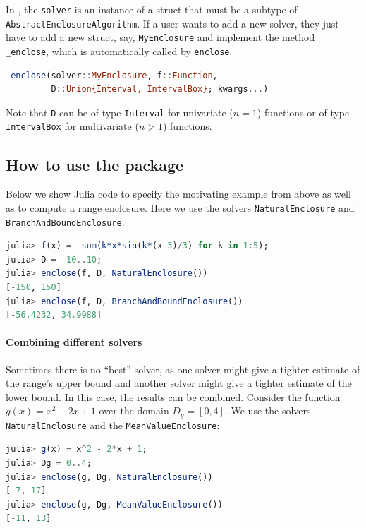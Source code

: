 \documentclass{juliacon}
\begin{document}
In \emph{\RE}, the \texttt{solver} is an instance of a struct that must be a subtype of \texttt{AbstractEnclosureAlgorithm}.
If a user wants to add a new solver, they just have to add a new struct, say, \texttt{MyEnclosure} and implement the method \texttt{\_enclose}, which is automatically called by \texttt{enclose}.
%
\begin{lstlisting}[language=Julia]
_enclose(solver::MyEnclosure, f::Function,
         D::Union{Interval, IntervalBox}; kwargs...)
\end{lstlisting}

Note that \texttt{D} can be of type \texttt{Interval} for univariate ($n = 1$) functions or of type \texttt{IntervalBox} for multivariate ($n > 1$) functions.


\subsection{How to use the package}

Below we show Julia code to specify the motivating example from above as well as to compute a range enclosure. Here we use the solvers \texttt{NaturalEnclosure} and \texttt{BranchAndBoundEnclosure}.

\begin{lstlisting}[language=Julia]
julia> f(x) = -sum(k*x*sin(k*(x-3)/3) for k in 1:5);
julia> D = -10..10;
julia> enclose(f, D, NaturalEnclosure())
[-150, 150]
julia> enclose(f, D, BranchAndBoundEnclosure())
[-56.4232, 34.9988]
\end{lstlisting}


\paragraph*{Combining different solvers}

Sometimes there is no ``best'' solver, as one solver might give a tighter estimate of the range's upper bound and another solver might give a tighter estimate of the lower bound. In this case, the results can be combined. Consider the function $g(x) = x^2 - 2x + 1$ over the domain $D_g = [0, 4]$. We use the solvers \texttt{NaturalEnclosure} and the \texttt{MeanValueEnclosure}:

\begin{lstlisting}[language=Julia]
julia> g(x) = x^2 - 2*x + 1;
julia> Dg = 0..4;
julia> enclose(g, Dg, NaturalEnclosure())
[-7, 17]
julia> enclose(g, Dg, MeanValueEnclosure())
[-11, 13]
\end{lstlisting}
\end{document}
